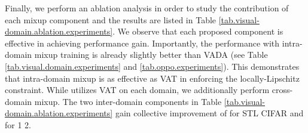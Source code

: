 Finally, we perform an ablation analysis in order to study the contribution of each mixup component and the results are listed in Table \ref{tab.visual-domain.ablation.experiments}. We observe that each proposed component is effective in achieving performance gain. Importantly, the performance with intra-domain mixup training is already slightly better than VADA (see Table \ref{tab.visual.domain.experiments} and \ref{tab.oppo.experiments}). This demonstrates that intra-domain mixup is as effective as VAT \cite{shu2018dirt} in enforcing the locally-Lipschitz constraint. While \cite{shu2018dirt} utilizes VAT on each domain, we additionally perform cross-domain mixup. The two inter-domain components in Table \ref{tab.visual-domain.ablation.experiments} gain collective improvement of  for STL  CIFAR and  for 1  2.





















